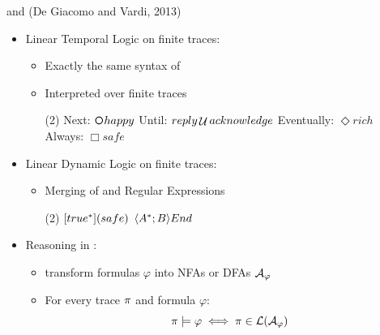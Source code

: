 \documentclass{beamer}
\begin{document}
\begin{frame}{\LTLf and \LDLf (De Giacomo and Vardi, 2013)}
	\begin{itemize}
		\item Linear Temporal Logic on finite traces: \LTLf
			\begin{itemize}
				\item Exactly the same syntax of \LTLf
				\item Interpreted over finite traces
	
			\begin{tasks}[counter-format = -](2)
				\task Next: $\Next happy$
				\task Until: $reply \mathop{\mathcal{U}} acknowledge$
				\task Eventually: $\Diamond rich$
				\task Always: $\Box safe$
			\end{tasks}
			
			\end{itemize}

	
		\item Linear Dynamic Logic on finite traces: \LTLf
			\begin{itemize}
				\item Merging of \LTLf and Regular Expressions
	
				\begin{tasks}[counter-format = -](2)
					\task $[true^*](safe)$
					\task $\langle A^*;B \rangle End$
				\end{tasks}
			\end{itemize}
		
		\item Reasoning in \LLf:
			\begin{itemize}
				\item transform formulas $\varphi$ into NFAs or DFAs $\mathcal{A}_\varphi$
				\item For every trace $\pi$ and \LLf formula $\varphi$: \[\pi \models \varphi \iff \pi \in \mathcal{L}(\mathcal{A}_\varphi)\]
			\end{itemize}
	\end{itemize}
\end{frame}
\end{document}
